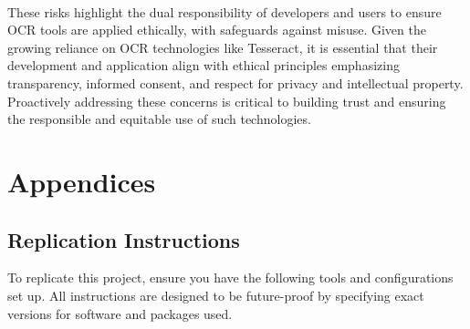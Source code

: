 \documentclass[10pt,twocolumn]{article}
\begin{document}
\paragraph{} These risks highlight the dual responsibility of developers and users to ensure OCR tools are applied ethically, with safeguards against misuse. Given the growing reliance on OCR technologies like Tesseract, it is essential that their development and application align with ethical principles emphasizing transparency, informed consent, and respect for privacy and intellectual property. Proactively addressing these concerns is critical to building trust and ensuring the responsible and equitable use of such technologies.

\section{Appendices}
\subsection{Replication Instructions}

To replicate this project, ensure you have the following tools and configurations set up. All instructions are designed to be future-proof by specifying exact versions for software and packages used.
\end{document}

